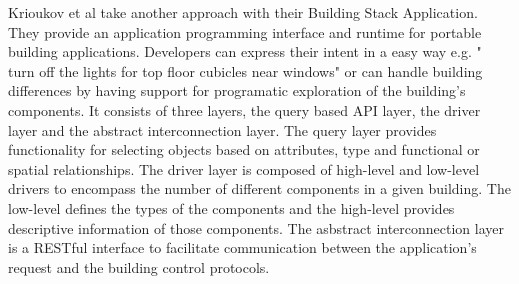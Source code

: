 Krioukov et al \cite{Krioukov12} take another approach with their Building Stack Application. They provide an application programming interface and runtime for portable building applications. Developers can express their intent in a easy way e.g. " turn off the lights
for top floor cubicles near windows" or can handle building differences by having support for programatic exploration of the building's components. It consists of three layers, the query based API layer, the driver layer and the abstract interconnection layer. 
The query layer provides functionality for selecting objects based on attributes, type and functional or spatial relationships. The driver layer is composed of high-level and low-level drivers to encompass the number of different components in a given building. The low-level defines the types of the components and the high-level provides descriptive information of those components. The asbstract interconnection layer is a RESTful interface to facilitate communication between the application's request and the building control protocols. 
